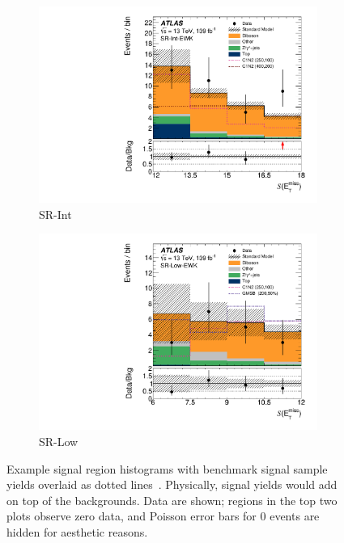\begin{figure}[tp]
\begin{subfigure}{0.48\textwidth}
\includegraphics[width=\textwidth]{figures/2ljets_sr_int_met_sig.pdf}
\caption{SR-Int}
\end{subfigure}
\hfill
\begin{subfigure}{0.48\textwidth}
\centering
\includegraphics[width=\textwidth]{figures/2ljets_sr_low_met_sig.pdf}
\caption{SR-Low}
\end{subfigure}
\caption[
Example signal region histograms with benchmark signal sample yields overlaid
]{%
Example signal region histograms with benchmark signal sample yields overlaid
as dotted lines~\cite{atlas2022searches}.
Physically, signal yields would add on top of the backgrounds.
Data are shown; regions in the top two plots observe zero data, and
Poisson error bars for $0$ events are hidden for aesthetic reasons.
}
\label{fig:2ljets_signal_examples}
\end{figure}

